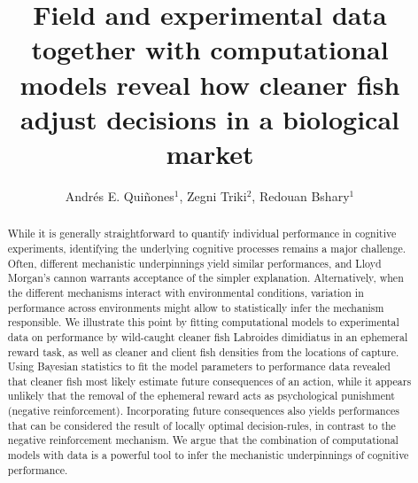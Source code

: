 \documentclass[]{rsos}%
\begin{document}
\title{Field and experimental data together with computational models reveal how cleaner fish adjust decisions in a biological market}

\author{
Andrés E. Quiñones$^{1}$,
Zegni Triki$^{2}$,
Redouan Bshary$^{1}$}

\address{
  $^{1}$Institute of Biology, University of Neuchâtel, Neuchâtel, Switzerland\\
  $^{2}$Department of Zoology, Stockholm University, Stockholm, Sweden}
\subject{
Behavioural ecology,
Cognitive ecology,
Animal behaviour}



\begin{abstract}
While it is generally straightforward to quantify individual performance in cognitive experiments, identifying the underlying cognitive processes remains a major challenge. Often, different mechanistic underpinnings yield similar performances, and Lloyd Morgan's cannon warrants acceptance of the simpler explanation. Alternatively, when the different mechanisms interact with environmental conditions, variation in performance across environments might allow to statistically infer the mechanism responsible. We illustrate this point by fitting computational models to experimental data on performance by wild-caught cleaner fish Labroides dimidiatus in an ephemeral reward task, as well as cleaner and client fish densities from the locations of capture. Using Bayesian statistics to fit the model parameters to performance data revealed that cleaner fish most likely estimate future consequences of an action, while it appears unlikely that the removal of the ephemeral reward acts as psychological punishment (negative reinforcement). Incorporating future consequences also yields performances that can be considered the result of locally optimal decision-rules, in contrast to the negative reinforcement mechanism. We argue that the combination of computational models with data is a powerful tool to infer the mechanistic underpinnings of cognitive performance.
\end{abstract}
\end{document}

